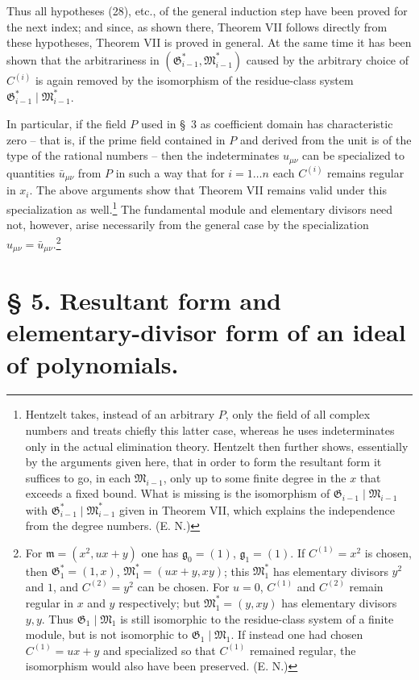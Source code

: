 \documentclass[11pt]{article}
\providecommand{\Gmod}{\mathfrak G}
\providecommand{\mideal}{\mathfrak m}
\providecommand{\gideal}{\mathfrak g}
\providecommand{\Gmod}{\mathfrak G}
\providecommand{\Mmod}{\mathfrak M}
\providecommand{\mideal}{\mathfrak m}
\providecommand{\gideal}{\mathfrak g}
\begin{document}
Thus all hypotheses (28), etc., of the general induction step have been proved for the next index; and since, as shown there, Theorem VII follows directly from these hypotheses, Theorem VII is proved in general. At the same time it has been shown that the arbitrariness in $(\Gmod^*_{i-1},\Mmod^*_{i-1})$ caused by the arbitrary choice of $C^{(i)}$ is again removed by the isomorphism of the residue-class system $\Gmod^*_{i-1}\mid\Mmod^*_{i-1}$.

In particular, if the field $P$ used in §~3 as coefficient domain has characteristic zero -- that is, if the prime field contained in $P$ and derived from the unit is of the type of the rational numbers -- then the indeterminates $u_{\mu\nu}$ can be specialized to quantities $\bar u_{\mu\nu}$ from $P$ in such a way that for $i=1\ldots n$ each $C^{(i)}$ remains regular in $x_i$. The above arguments show that Theorem VII remains valid under this specialization as well.\footnote{Hentzelt takes, instead of an arbitrary $P$, only the field of all complex numbers and treats chiefly this latter case, whereas he uses indeterminates only in the actual elimination theory. Hentzelt then further shows, essentially by the arguments given here, that in order to form the resultant form it suffices to go, in each $\Mmod_{i-1}$, only up to some finite degree in the $x$ that exceeds a fixed bound. What is missing is the isomorphism of $\Gmod_{i-1}\mid\Mmod_{i-1}$ with $\Gmod^*_{i-1}\mid\Mmod^*_{i-1}$ given in Theorem VII, which explains the independence from the degree numbers. (E. N.)} The fundamental module and elementary divisors need not, however, arise necessarily from the general case by the specialization $u_{\mu\nu}=\bar u_{\mu\nu}$.\footnote{For $\mideal=(x^2,ux+y)$ one has $\gideal_0=(1)$, $\gideal_1=(1)$. If $C^{(1)}=x^2$ is chosen, then $\Gmod_1^*=(1,x)$, $\Mmod_1^*=(ux+y,xy)$; this $\Mmod_1^*$ has elementary divisors $y^2$ and $1$, and $C^{(2)}=y^2$ can be chosen. For $u=0$, $C^{(1)}$ and $C^{(2)}$ remain regular in $x$ and $y$ respectively; but $\Mmod_1^*=(y,xy)$ has elementary divisors $y,y$. Thus $\Gmod_1\mid\Mmod_1$ is still isomorphic to the residue-class system of a finite module, but is not isomorphic to $\Gmod_1\mid\Mmod_1$. If instead one had chosen $C^{(1)}=ux+y$ and specialized so that $C^{(1)}$ remained regular, the isomorphism would also have been preserved. (E. N.)}

\section*{§ 5. Resultant form and elementary-divisor form of an ideal of polynomials.}
\end{document}
